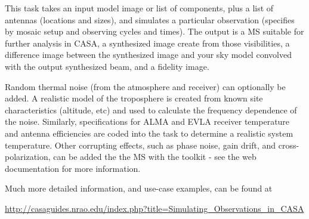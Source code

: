 This task takes an input model image or list of components, plus a
list of antennas (locations and sizes), and simulates a particular
observation (specifies by mosaic setup and observing cycles and
times).  The output is a MS suitable for further analysis in CASA, a
synthesized image create from those visibilities, a difference image
between the synthesized image and your sky model convolved with the
output synthesized beam, and a fidelity image.

Random thermal noise (from the atmosphere and receiver) can optionally
be added. A realistic model of the troposphere is created from known
site characteristics (altitude, etc) and used to calculate the
frequency dependence of the noise.  Similarly, specifications for ALMA
and EVLA receiver temperature and antenna efficiencies are coded into
the task to determine a realistic system temperature.  Other
corrupting effects, such as phase noise, gain drift, and
cross-polarization, can be added the the MS with the toolkit - see the
web documentation for more information.

Much more detailed information, and use-case examples, can be found at 

\url{http://casaguides.nrao.edu/index.php?title=Simulating_Observations_in_CASA}

